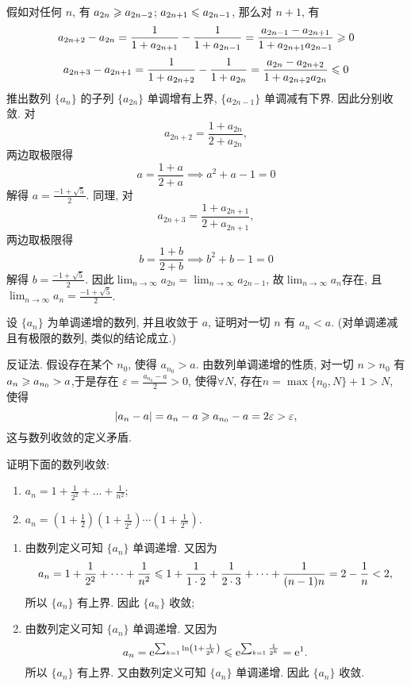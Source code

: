 \begin{solution}
\begin{enumerate}
        假如对任何 $n$, 有 $a_{2n} \geqslant a_{2n-2}$; $a_{2n+1} \leqslant a_{2n-1}$, 那么对 $n+1$, 有
$$ a_{2n+2} - a_{2n} = \frac{1}{1+a_{2n+1}} - \frac{1}{1+a_{2n-1}} = \frac{a_{2n-1}-a_{2n+1}}{1+a_{2n+1}a_{2n-1}} \geqslant 0 $$
$$ a_{2n+3} - a_{2n+1} = \frac{1}{1+a_{2n+2}} - \frac{1}{1+a_{2n}} = \frac{a_{2n}-a_{2n+2}}{1+a_{2n+2}a_{2n}} \leqslant 0 $$
推出数列 $\{a_n\}$ 的子列 $\{a_{2n}\}$ 单调增有上界, $\{a_{2n-1}\}$ 单调减有下界. 因此分别收敛. 对$$a_{2n+2} = \frac{1+a_{2n}}{2+a_{2n}},$$两边取极限得
$$ a = \frac{1+a}{2+a} \implies a^2 + a - 1 = 0 $$
解得 $a = \frac{-1+\sqrt{5}}{2}$. 同理, 对$$a_{2n+3} = \frac{1+a_{2n+1}}{2+a_{2n+1}},$$两边取极限得
$$ b = \frac{1+b}{2+b} \implies b^2 + b - 1 = 0 $$
解得 $b = \frac{-1+\sqrt{5}}{2}$.
因此$\lim_{n \to \infty} a_{2n} = \lim_{n \to \infty} a_{2n-1}$, 故$\lim_{n \to \infty} a_n$存在, 且$\lim_{n \to \infty} a_n = \frac{-1+\sqrt{5}}{2}$.
    \end{enumerate}
\end{solution}

\begin{exercise}[1.C.2]
    设 $\{a_n\}$ 为单调递增的数列, 并且收敛于 $a$, 证明对一切 $n$ 有 $a_n < a$. (对单调递减且有极限的数列, 类似的结论成立.)
\end{exercise}

\begin{solution}
    反证法. 假设存在某个 $n_0$, 使得 $a_{n_0} > a$. 由数列单调递增的性质, 对一切 $n > n_0$ 有 $a_n \geqslant a_{n_0} > a$,于是存在 $\varepsilon = \frac{a_{n_0} - a}{2} > 0$, 使得$\forall N$, 存在$ n = \max\{n_0, N\} + 1 > N$, 使得
    $$ |a_n - a| = a_n - a \geqslant a_{n_0} - a = 2\varepsilon > \varepsilon, $$
    这与数列收敛的定义矛盾.
\end{solution}

\begin{exercise}[1.C.3]
    证明下面的数列收敛:
    \begin{enumerate}
        \item $a_n = 1 + \frac{1}{2^2} + \dots + \frac{1}{n^2}$;
        \item $a_n = \left(1+\frac{1}{2}\right)\left(1+\frac{1}{2^2}\right)\cdots\left(1+\frac{1}{2^n}\right)$.
    \end{enumerate}
\end{exercise}

\begin{solution}
    \begin{enumerate}[(1)]
        \item 由数列定义可知 $\{a_n\}$ 单调递增. 又因为
              $$ a_n = 1 + \frac{1}{2^2} + \dots + \frac{1}{n^2} \leqslant 1 + \frac{1}{1 \cdot 2} + \frac{1}{2 \cdot 3} + \dots + \frac{1}{(n-1)n} = 2 - \frac{1}{n} < 2, $$
              所以 $\{a_n\}$ 有上界. 因此 $\{a_n\}$ 收敛;
              \item 由数列定义可知 $\{a_n\}$ 单调递增. 又因为
              $$a_n = \mathrm{e}^{\sum_{k=1} \ln \left(1 + \frac{1}{2^k}\right)} \leqslant \mathrm{e}^{\sum_{k=1} \frac{1}{2^k}} = \mathrm{e}^1.$$
              所以 $\{a_n\}$ 有上界. 又由数列定义可知 $\{a_n\}$ 单调递增. 因此 $\{a_n\}$ 收敛.
    \end{enumerate}
\end{solution}

